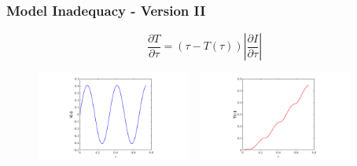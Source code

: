 \documentclass[10pt,xcolor=dvipsnames,compress]{beamer}
\begin{document}
\begin{frame}
\frametitle{Model Inadequacy - Version II}
\vfill

 
\begin{equation*}
\frac{\partial T}{\partial\tau} = (\tau - T(\tau)) \left| \frac{\partial I}{\partial\tau} \right|
\end{equation*}


\begin{figure}[h]
    \centering
    \includegraphics[trim = 3.8in 0.2in 4.3in 0.2in, clip, width=0.45\textwidth]{figs/Isin.png} 
    ~
    \includegraphics[trim = 3.8in 0.2in 4.3in 0.2in, clip, width=0.45\textwidth]{figs/Tsin.png}
        \vspace{-3mm}
\end{figure}


\vfill
\end{frame}
\end{document}

